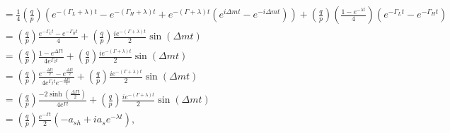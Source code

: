 \begin{align}
&= \frac{1}{4}\left(\frac{q}{p}\right)\left(e^{-(\Gamma_L+\lambda)t}-e^{-(\Gamma_H+\lambda)t}+e^{-(\Gamma+\lambda)t}\left( e^{i\Delta m t}-e^{-i\Delta m t}\right)\right) + \left(\frac{q}{p}\right)\left(\frac{1-e^{-\lambda t}}{4}\right)(e^{-\Gamma_L t} - e^{-\Gamma_H t}) \nonumber \\
&= \left(\frac{q}{p}\right)\frac{e^{-\Gamma_L t}-e^{-\Gamma_H t}}{4}+\left(\frac{q}{p}\right)\frac{ie^{-(\Gamma + \lambda)t}}{2}\sin(\Delta m t) \nonumber \\
&= \left(\frac{q}{p}\right)\frac{1-e^{\Delta \Gamma t}}{4e^{\Gamma_2 t}}+\left(\frac{q}{p}\right)\frac{ie^{-(\Gamma + \lambda)t}}{2}\sin(\Delta m t) \nonumber \\
&= \left(\frac{q}{p}\right)\frac{e^{-\frac{\Delta \Gamma t}{2}}-e^{\frac{\Delta \Gamma t}{2}}}{4e^{\Gamma_2 t}e^{-\frac{\Delta \Gamma t}{2}}}+\left(\frac{q}{p}\right)\frac{ie^{-(\Gamma + \lambda)t}}{2}\sin(\Delta m t) \nonumber \\
&= \left(\frac{q}{p}\right)\frac{-2\sinh\left(\frac{\Delta \Gamma t}{2}\right)}{4e^{\Gamma t}}+\left(\frac{q}{p}\right)\frac{ie^{-(\Gamma + \lambda)t}}{2}\sin(\Delta m t) \nonumber \\
&=\left(\frac{q}{p}\right)\frac{e^{-\Gamma t}}{2}\left(-a_{sh}+ia_s e^{-\lambda t}\right),
\end{align}
